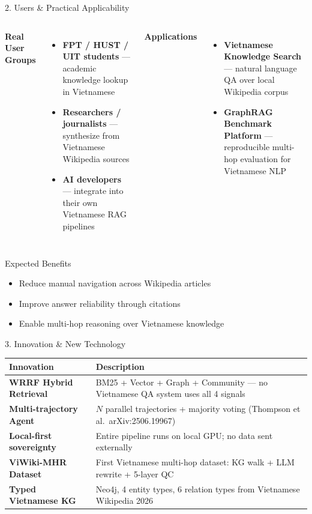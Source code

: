 \documentclass[aspectratio=169]{beamer}
\begin{document}
\begin{frame}[shrink=5]{2. Users \& Practical Applicability}
\begin{columns}[T]
\textbf{Real User Groups}
\begin{itemize}
  \item \textbf{FPT / HUST / UIT students} --- academic knowledge lookup in Vietnamese
  \item \textbf{Researchers / journalists} --- synthesize from Vietnamese Wikipedia sources
  \item \textbf{AI developers} --- integrate into their own Vietnamese RAG pipelines
\end{itemize}

\textbf{Applications}
\begin{itemize}
  \item \textbf{Vietnamese Knowledge Search} --- natural language QA over local Wikipedia corpus
  \item \textbf{GraphRAG Benchmark Platform} --- reproducible multi-hop evaluation for Vietnamese NLP
\end{itemize}
\end{columns}
\vspace{0.4em}
\begin{block}{Expected Benefits}
\begin{itemize}
  \item Reduce manual navigation across Wikipedia articles
  \item Improve answer reliability through citations
  \item Enable multi-hop reasoning over Vietnamese knowledge
\end{itemize}
\end{block}
\end{frame}

\begin{frame}{3. Innovation \& New Technology}
\begin{center}
\small
\begin{tabular}{l>{\raggedright\arraybackslash}p{7.5cm}}
\toprule
\textbf{Innovation} & \textbf{Description} \\
\midrule
\textbf{WRRF Hybrid Retrieval} & BM25 + Vector + Graph + Community --- no Vietnamese QA system uses all 4 signals \\[4pt]
\textbf{Multi-trajectory Agent} & $N$ parallel trajectories + majority voting (Thompson et al.\ arXiv:2506.19967) \\[4pt]
\textbf{Local-first sovereignty} & Entire pipeline runs on local GPU; no data sent externally \\[4pt]
\textbf{ViWiki-MHR Dataset} & First Vietnamese multi-hop dataset: KG walk + LLM rewrite + 5-layer QC \\[4pt]
\textbf{Typed Vietnamese KG} & Neo4j, 4 entity types, 6 relation types from Vietnamese Wikipedia 2026 \\
\bottomrule
\end{tabular}
\end{center}
\end{frame}
\end{document}
